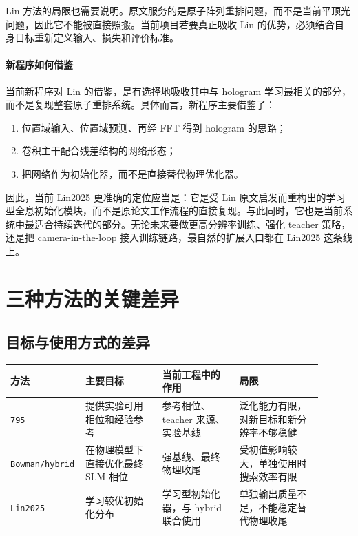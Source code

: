 \documentclass[12pt,a4paper]{ctexart}
\begin{document}
Lin 方法的局限也需要说明。原文服务的是原子阵列重排问题，而不是当前平顶光问题，因此它不能被直接照搬。当前项目若要真正吸收 Lin 的优势，必须结合自身目标重新定义输入、损失和评价标准。

\paragraph{新程序如何借鉴}
当前新程序对 Lin 的借鉴，是有选择地吸收其中与 hologram 学习最相关的部分，而不是复现整套原子重排系统。具体而言，新程序主要借鉴了：
\begin{enumerate}[label=\arabic*.]
    \item 位置域输入、位置域预测、再经 FFT 得到 hologram 的思路；
    \item 卷积主干配合残差结构的网络形态；
    \item 把网络作为初始化器，而不是直接替代物理优化器。
\end{enumerate}

因此，当前 Lin2025 更准确的定位应当是：它是受 Lin 原文启发而重构出的学习型全息初始化模块，而不是原论文工作流程的直接复现。与此同时，它也是当前系统中最适合持续迭代的部分。无论未来要做更高分辨率训练、强化 teacher 策略，还是把 camera-in-the-loop 接入训练链路，最自然的扩展入口都在 Lin2025 这条线上。

\section{三种方法的关键差异}

\subsection{目标与使用方式的差异}
\begin{table}[H]
\centering
\small
\begin{tabular}{>{\raggedright\arraybackslash}p{0.16\linewidth} >{\raggedright\arraybackslash}p{0.24\linewidth} >{\raggedright\arraybackslash}p{0.24\linewidth} >{\raggedright\arraybackslash}p{0.26\linewidth}}
\toprule
\textbf{方法} & \textbf{主要目标} & \textbf{当前工程中的作用} & \textbf{局限} \\
\midrule
\texttt{795} & 提供实验可用相位和经验参考 & 参考相位、teacher 来源、实验基线 & 泛化能力有限，对新目标和新分辨率不够稳健 \\
\texttt{Bowman/hybrid} & 在物理模型下直接优化最终 SLM 相位 & 强基线、最终物理收尾 & 受初值影响较大，单独使用时搜索效率有限 \\
\texttt{Lin2025} & 学习较优初始化分布 & 学习型初始化器，与 hybrid 联合使用 & 单独输出质量不足，不能稳定替代物理收尾 \\
\bottomrule
\end{tabular}
\end{table}
\end{document}
